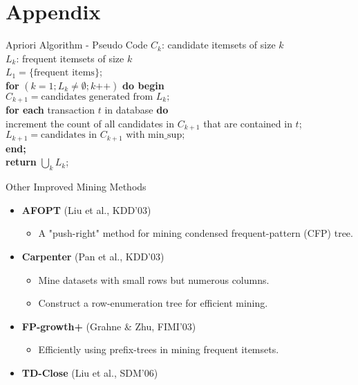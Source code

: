 \section*{Appendix}

\begin{frame}{Apriori Algorithm - Pseudo Code}
	$C_k$: candidate itemsets of size $k$\\
	$L_k$: frequent itemsets of size $k$\\[0.5cm]

	$L_1 = \{\text{frequent items}\}$;\\[0.5cm]
	\textbf{for} $(k=1; L_k \neq \emptyset; k\texttt{++})$ \textbf{do begin}\\
	\hspace{1cm} $C_{k+1} = \text{candidates generated from } L_k;$\\
	\hspace{1cm} \textbf{for each} transaction $t$ in database \textbf{do}\\
	\hspace{2cm} increment the count of all candidates in $C_{k+1}$ that are
	contained in $t$;\\[0.1cm]
	\hspace{1cm}$L_{k+1} = \text{candidates in } C_{k+1} \text{ with
			min\_sup};$\\
	\textbf{end;}\\[0.1cm]
	\textbf{return} $\bigcup_k L_k$;
\end{frame}

\begin{frame}{Other Improved Mining Methods}
	\begin{itemize}
		\item \textbf{AFOPT} (Liu et al., KDD'03)
		      \begin{itemize}
			      \item A "push-right" method for mining condensed frequent-pattern
			            (CFP) tree.
		      \end{itemize}
		\item \textbf{Carpenter} (Pan et al., KDD'03)
		      \begin{itemize}
			      \item Mine datasets with small rows but numerous columns.
			      \item Construct a row-enumeration tree for efficient mining.
		      \end{itemize}
		\item \textbf{FP-growth+} (Grahne \& Zhu, FIMI'03)
		      \begin{itemize}
			      \item Efficiently using prefix-trees in mining frequent itemsets.
		      \end{itemize}
		\item \textbf{TD-Close} (Liu et al., SDM'06)
	\end{itemize}
\end{frame}

